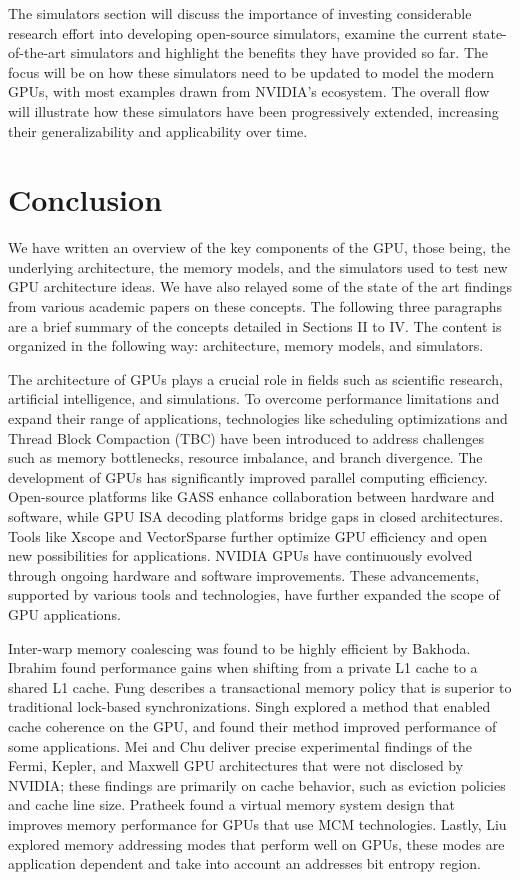 \documentclass[conference]{IEEEtran}
\begin{document}
The simulators section will discuss the importance of investing considerable research effort into developing open-source simulators, examine the current state-of-the-art simulators and highlight the benefits they have provided so far.
The focus will be on how these simulators need to be updated to model the modern GPUs, with most examples drawn from NVIDIA's ecosystem.
The overall flow will illustrate how these simulators have been progressively extended, increasing their generalizability and applicability over time.




\section{Conclusion}
We have written an overview of the key components of the GPU, those being, the underlying architecture, the memory models, and the simulators used to test new GPU architecture ideas.
We have also relayed some of the state of the art findings from various academic papers on these concepts.
The following three paragraphs are a brief summary of the concepts detailed in Sections II to IV. The content is organized in the following way: architecture, memory models, and simulators.

The architecture of GPUs plays a crucial role in fields such as scientific research, artificial intelligence, and simulations. To overcome performance limitations and expand their range of applications, technologies like scheduling optimizations and Thread Block Compaction (TBC) have been introduced to address challenges such as memory bottlenecks, resource imbalance, and branch divergence.
The development of GPUs has significantly improved parallel computing efficiency. Open-source platforms like GASS enhance collaboration between hardware and software, while GPU ISA decoding platforms bridge gaps in closed architectures. Tools like Xscope and VectorSparse further optimize GPU efficiency and open new possibilities for applications.
NVIDIA GPUs have continuously evolved through ongoing hardware and software improvements. These advancements, supported by various tools and technologies, have further expanded the scope of GPU applications.

Inter-warp memory coalescing was found to be highly efficient by Bakhoda.
Ibrahim found performance gains when shifting from a private L1 cache to a shared L1 cache.
Fung describes a transactional memory policy that is superior to traditional lock-based synchronizations.
Singh explored a method that enabled cache coherence on the GPU, and found their method improved performance of some applications.
Mei and Chu deliver precise experimental findings of the Fermi, Kepler, and Maxwell GPU architectures that were not disclosed by NVIDIA; these findings are primarily on cache behavior, such as eviction policies and cache line size.
Pratheek found a virtual memory system design that improves memory performance for GPUs that use MCM technologies.
Lastly, Liu explored memory addressing modes that perform well on GPUs, these modes are application dependent and take into account an addresses bit entropy region.
\end{document}
